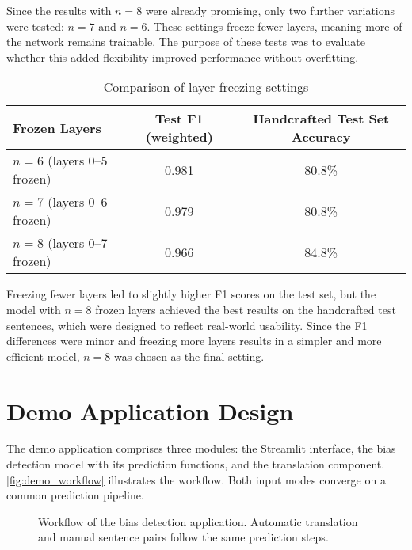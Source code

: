     Since the results with $n=8$ were already promising, only two further variations were tested: $n=7$ and $n=6$. These settings freeze fewer layers, meaning more of the network remains trainable. The purpose of these tests was to evaluate whether this added flexibility improved performance without overfitting.

    \vspace{0.8em}
    \begin{table}[ht]
        \centering
        \begin{tabularx}{\linewidth}{Xcc}
        \toprule
        \textbf{Frozen Layers} & \textbf{Test F1 (weighted)} & \textbf{Handcrafted Test Set Accuracy} \\
        \midrule
        $n=6$ (layers 0--5 frozen) & 0.981 & 80.8\% \\
        $n=7$ (layers 0--6 frozen) & 0.979 & 80.8\% \\
        $n=8$ (layers 0--7 frozen) & 0.966 & 84.8\% \\
        \bottomrule
        \end{tabularx}
        \caption{Comparison of layer freezing settings}
    \end{table}

    Freezing fewer layers led to slightly higher F1 scores on the test set, but the model with $n=8$ frozen layers achieved the best results on the handcrafted test sentences, which were designed to reflect real-world usability. Since the F1 differences were minor and freezing more layers results in a simpler and more efficient model, $n=8$ was chosen as the final setting.

\section{Demo Application Design}
    The demo application comprises three modules: the Streamlit interface, the bias detection model with its prediction functions, and the translation component. \autoref{fig:demo_workflow} illustrates the workflow. Both input modes converge on a common prediction pipeline.

\begin{figure}[htb]
    \centering
    \scalebox{0.8}{}
    \caption[Workflow of the bias detection application]{Workflow of the bias detection application. Automatic translation and manual sentence pairs follow the same prediction steps.}
    \label{fig:demo_workflow}
\end{figure}


